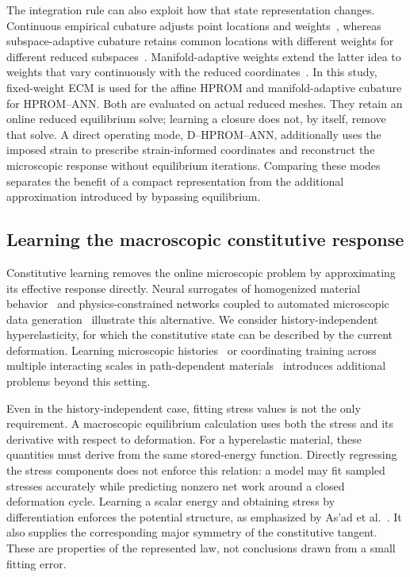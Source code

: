 The integration rule can also exploit how that state representation changes. Continuous empirical cubature adjusts point locations and weights~\cite{Hernandez2024}, whereas subspace-adaptive cubature retains common locations with different weights for different reduced subspaces~\cite{Bravo2024}. Manifold-adaptive weights extend the latter idea to weights that vary continuously with the reduced coordinates~\cite{hernandez2026}. In this study, fixed-weight ECM is used for the affine HPROM and manifold-adaptive cubature for HPROM--ANN. Both are evaluated on actual reduced meshes. They retain an online reduced equilibrium solve; learning a closure does not, by itself, remove that solve. A direct operating mode, D--HPROM--ANN, additionally uses the imposed strain to prescribe strain-informed coordinates and reconstruct the microscopic response without equilibrium iterations. Comparing these modes separates the benefit of a compact representation from the additional approximation introduced by bypassing equilibrium.

\subsection{Learning the macroscopic constitutive response}
Constitutive learning removes the online microscopic problem by approximating its effective response directly. Neural surrogates of homogenized material behavior~\cite{Aldakheel2023} and physics-constrained networks coupled to automated microscopic data generation~\cite{kalina2023} illustrate this alternative. We consider history-independent hyperelasticity, for which the constitutive state can be described by the current deformation. Learning microscopic histories~\cite{Liu2022} or coordinating training across multiple interacting scales in path-dependent materials~\cite{AsadFarhat2026} introduces additional problems beyond this setting.

Even in the history-independent case, fitting stress values is not the only requirement. A macroscopic equilibrium calculation uses both the stress and its derivative with respect to deformation. For a hyperelastic material, these quantities must derive from the same stored-energy function. Directly regressing the stress components does not enforce this relation: a model may fit sampled stresses accurately while predicting nonzero net work around a closed deformation cycle. Learning a scalar energy and obtaining stress by differentiation enforces the potential structure, as emphasized by As'ad et al.~\cite{asad2022}. It also supplies the corresponding major symmetry of the constitutive tangent. These are properties of the represented law, not conclusions drawn from a small fitting error.

